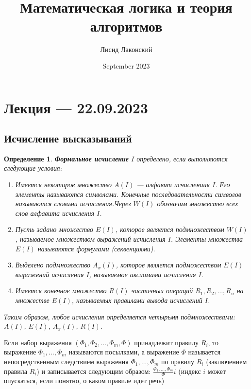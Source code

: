 \documentclass{article}
\title{Математическая логика и теория алгоритмов}
\author{Лисид Лаконский}
\date{September 2023}
\newtheorem{definition}{Определение}
\begin{document}
\raggedright

\maketitle

\tableofcontents
\pagebreak

\section{Лекция — 22.09.2023}

\subsection{Исчисление высказываний}

\begin{definition}
    \textbf{Формальное исчисление} $I$ определено, если выполняются следующие условия:
    \begin{enumerate}
        \item Имеется некоторое множество $A(I)$ — алфавит исчислениия $I$. Его элементы называются символами. Конечные последовательности символов называются словами исчисления.Через $W(I)$ обозначим множество всех слов алфавита исчисления $I$.
        \item Пусть задано множество $E(I)$, которое является подмножеством $W(I)$, называемое множеством выражений исчисления $I$. Элементы множества $E(I)$ называются формулами (секвенциями).
        \item Выделено подмножество $A_x(I)$, которое является подможеством $E(I)$ выражений исчисления $I$, называемое аксиомами исчисления $I$.
        \item Имеется конечное множество $R(I)$ частичных операций $R_{1}, R_{2}, \dots, R_{n}$ на множестве $E(I)$, называемых правилами вывода исчислений $I$.
    \end{enumerate}
    Таким образом, любое исчисления определяется четырьмя подмножествами: $A(I)$, $E(I)$, $A_{x}(I)$, $R(I)$.
\end{definition}

Если набор выражения $(\Phi_{1}, \Phi_{2}, \dots, \Phi_{m}, \Phi)$ принадлежит правилу $R_{i}$, то выражение $\Phi_{1}, \dots, \Phi_{m}$ называются посылками, а выражение $\Phi$ называется непосредственным следствием выражения $\Phi_{1}, \dots, \Phi_{m}$ по правилу $R_{i}$ (заключением правила $R_{i}$) и записывается следующим образом: $\frac{\Phi_{1}, \dots, \Phi_{m}}{\Phi} i$ (индекс $i$ может опускаться, если понятно, о каком правиле идет речь)
\end{document}
